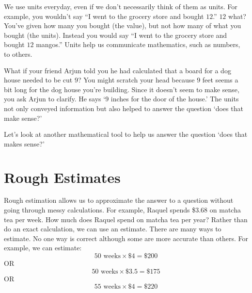 \documentclass{ximera}
\begin{document}






We use units everyday, even if we don't necessarily think of them as units.  For example, you wouldn't say ``I went to the grocery store and bought $12$.''  $12$ what?  You've given how many you bought (the value), but not how many of what you bought (the units).  Instead you would say ``I went to the grocery store and bought $12$ mangos.'' Units help us communicate mathematics, such as numbers, to others.

What if your friend Arjun told you he had calculated that a board for a dog house needed to be cut $9$? You might scratch your head because $9$ feet seems a bit long for the dog house you're building. Since it doesn't seem to make sense, you ask Arjun to clarify. He says `$9$ inches for the door of the house.' The units not only conveyed information but also helped to answer the question `does that make sense?'

Let's look at another mathematical tool to help us answer the question `does that makes sense?'

\section{Rough Estimates}
Rough estimation allows us to approximate the answer to a question without going through messy calculations. For example, Raquel spends \$$3.68$ on matcha tea per week. How much does Raquel spend on matcha tea per year? Rather than do an exact calculation, we can use an estimate. There are many ways to estimate.  No one way is correct although some are more accurate than others. For example, we can estimate:
$$50 \text{ weeks} \times \$4=\$200$$
OR $$50 \text{ weeks} \times \$3.5=\$175$$
OR $$55 \text{ weeks} \times \$4=\$220$$
\end{document}
